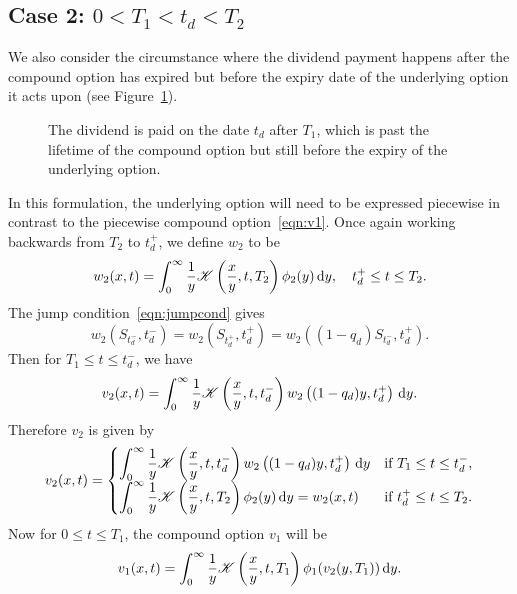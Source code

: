 \subsection{Case 2: $0 < T_1 < t_d < T_2$}
We also consider the circumstance where the dividend payment happens after the compound option has expired but before the expiry date of the underlying option it acts upon (see Figure~\ref{fig:3}).

\begin{figure}[!h]
\centering
{}
\caption{The dividend is paid on the date $t_d$ after $T_1$, which is past the lifetime of the compound option but still before the expiry of the underlying option.}
\label{fig:3}
\end{figure}
\noindent
In this formulation, the underlying option will need to be expressed piecewise in contrast to the piecewise compound option~\eqref{eqn:v1}. Once again working backwards from $T_2$ to $t_d^+$, we define $w_2$ to be
		$$
			w_2(x,t) = \int_0^\infty \frac{1}{y}\mathscr K\left( \frac{x}{y}, t, T_2 \right)\phi_2(y) \, \mathrm d y, \quad t_d^+ \leq t \leq T_2.
		$$
The jump condition~\eqref{eqn:jumpcond} gives
		$$
			w_2\left(S_{t_d^-},t_d^-\right) = w_2\left(S_{t_d^+},t_d^+\right) = w_2\left((1-q_d)S_{t_d^-},t_d^+\right).
		$$
Then for $T_1 \leq t \leq t_d^-$, we have
		$$
			v_2(x,t) = \int_0^\infty \frac{1}{y} \mathscr K\left( \frac{x}{y}, t, t_d^- \right)w_2\left( (1-q_d)y, t_d^+ \right) \, \mathrm d y.
		$$
Therefore $v_2$ is given by
		\begin{equation}
			v_2(x,t) =
			\begin{cases}
				\displaystyle\int_0^\infty \frac{1}{y} \mathscr K\left( \frac{x}{y}, t, t_d^- \right)w_2\left( (1-q_d)y, t_d^+ \right) \, \mathrm d y & \text{if } T_1 \leq t \leq t_d^-, \\
				\displaystyle\int_0^\infty \frac{1}{y} \mathscr K\left( \frac{x}{y}, t, T_2 \right) \phi_2(y) \, \mathrm d y = w_2(x,t) & \text{if } t_d^+ \leq t \leq T_2.
			\end{cases}
		\end{equation}
Now for $0 \leq t \leq T_1$, the compound option $v_1$ will be
		\begin{equation}
			\label{eqn:v1a}
			v_1(x,t) = \int_0^\infty \frac{1}{y} \mathscr K\left( \frac{x}{y}, t, T_1 \right)\phi_1(v_2(y,T_1))\, \mathrm d y.
		\end{equation}

